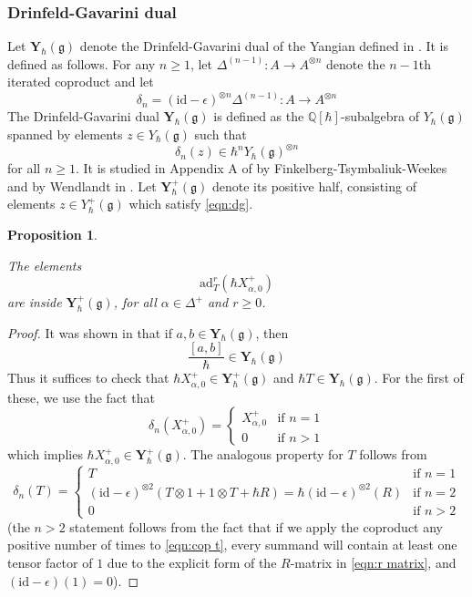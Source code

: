 \documentclass{amsart}
\newtheorem{proposition}[theorem]{Proposition}
\def\fg{{\mathfrak{g}}}
\begin{document}
\subsubsection{Drinfeld-Gavarini dual}Let $\mathbf{Y}_{\hbar}(\fg)$ denote the Drinfeld-Gavarini dual of the Yangian defined in \cite{Gavarini}. It is defined as follows. For any $n \geq 1$, let $\Delta^{(n-1)}: A \rightarrow A^{\otimes n}$ denote the $n-1$th iterated coproduct and let 
\[
\delta_n = (\mathrm{id}-\epsilon)^{\otimes n} \Delta^{(n-1)}: A \rightarrow  A^{\otimes n}
\]
The Drinfeld-Gavarini dual $\mathbf{Y}_{\hbar}(\fg)$ is defined as the $\mathbb{Q}[\hbar]$-subalgebra of $Y_{\hbar}(\fg)$ spanned by elements $z \in Y_{\hbar}(\fg)$ such that 
\begin{equation}
\label{eqn:dg}
\delta_n(z) \in \hbar^n Y_{\hbar}(\fg)^{\otimes n}
\end{equation}
for all $n \geq 1$. It is studied in Appendix A of \cite{FT} by Finkelberg-Tsymbaliuk-Weekes and by Wendlandt in \cite[Section 5]{CWendl}. Let $\mathbf{Y}^+_{\hbar}(\fg)$ denote its positive half, consisting of elements $z \in Y^+_{\hbar}(\fg)$ which satisfy \eqref{eqn:dg}. 

\medskip 

\begin{proposition}
\label{prop:pbw}

The elements
\begin{equation}
\label{eqn:elements}
\mathrm{ad}_T^r(\hbar X^+_{\alpha,0})
\end{equation}
are inside $\mathbf{Y}^+_{\hbar}(\fg)$, for all $\alpha \in \Delta^+$ and $r \geq 0$.

\end{proposition}

\medskip 

\begin{proof} It was shown in \cite[Lemma A.3]{FT} that if $a,b \in \mathbf{Y}_{\hbar}(\fg)$, then 
$$
\frac{[a,b]}{\hbar} \in \mathbf{Y}_{\hbar}(\fg)
$$
Thus it suffices to check that $\hbar X^+_{\alpha,0} \in \mathbf{Y}^+_{\hbar}(\fg)$ and $\hbar T \in \mathbf{Y}_{\hbar}(\fg)$. For the first of these, we use the fact that 
$$
\delta_n(X^+_{\alpha,0}) = \begin{cases} X^+_{\alpha,0} &\text{if }n = 1 \\ 0 &\text{if }n > 1 \end{cases}
$$ 
which implies $\hbar X^+_{\alpha,0} \in \mathbf{Y}^+_{\hbar}(\fg)$. The analogous property for $T$  follows from
$$
\delta_n(T)= \begin{cases} T &\text{if }n=1 \\ (\mathrm{id}-\epsilon)^{\otimes 2}(T \otimes 1 + 1 \otimes T + \hbar R) = \hbar (\mathrm{id}-\epsilon)^{\otimes 2}(R) &\text{if }n = 2 \\ 0&\text{if }n > 2 \end{cases}
$$
(the $n>2$ statement follows from the fact that if we apply the coproduct any positive number of times to \eqref{eqn:cop t}, every summand will contain at least one tensor factor of $1$ due to the explicit form of the $R$-matrix in \eqref{eqn:r matrix}, and $(\text{id} - \epsilon)(1) = 0$). \end{proof}
\end{document}
